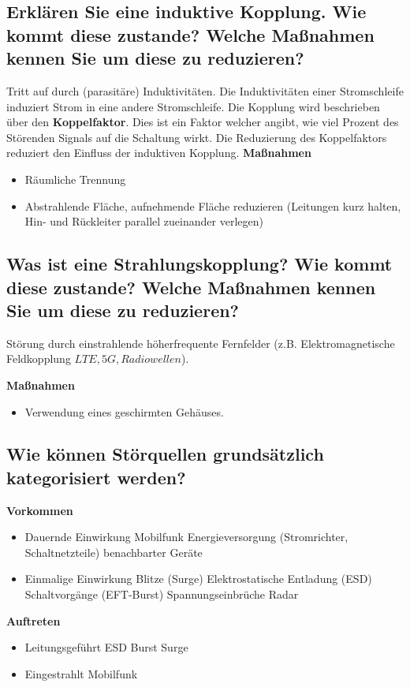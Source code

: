 \subsection{Erklären Sie eine induktive Kopplung. Wie kommt diese zustande? Welche Maßnahmen kennen Sie um diese zu reduzieren?}
Tritt auf durch (parasitäre) Induktivitäten. Die Induktivitäten einer Stromschleife induziert Strom in eine andere Stromschleife.\p
Die Kopplung wird beschrieben über den \textbf{Koppelfaktor}. Dies ist ein Faktor welcher angibt, wie viel Prozent des Störenden Signals auf die Schaltung wirkt. Die Reduzierung des Koppelfaktors reduziert den Einfluss der induktiven Kopplung.\p
\textbf{Maßnahmen}
\begin{itemize}
  \item Räumliche Trennung
  \item Abstrahlende Fläche, aufnehmende Fläche reduzieren (Leitungen kurz halten, Hin- und Rückleiter parallel zueinander verlegen)
\end{itemize}

\subsection{Was ist eine Strahlungskopplung? Wie kommt diese zustande? Welche Maßnahmen kennen Sie um diese zu reduzieren?}
Störung durch einstrahlende höherfrequente Fernfelder (z.B. Elektromagnetische Feldkopplung \(LTE, 5G, Radiowellen\)).

\textbf{Maßnahmen}
\begin{itemize}
  \item Verwendung eines geschirmten Gehäuses.
\end{itemize}

\subsection{Wie können Störquellen grundsätzlich kategorisiert werden?}
\textbf{Vorkommen}
\begin{itemize}
  \item Dauernde Einwirkung
  \subitem Mobilfunk
  \subitem Energieversorgung (Stromrichter, Schaltnetzteile) benachbarter Geräte
  \item Einmalige Einwirkung
  \subitem Blitze (Surge)
  \subitem Elektrostatische Entladung (ESD)
  \subitem Schaltvorgänge (EFT-Burst)
  \subitem Spannungseinbrüche
  \subitem Radar
\end{itemize}
%
\textbf{Auftreten}
\begin{itemize}
  \item Leitungsgeführt
  \subitem ESD
  \subitem Burst
  \subitem Surge

  \item Eingestrahlt
  \subitem Mobilfunk
\end{itemize}


